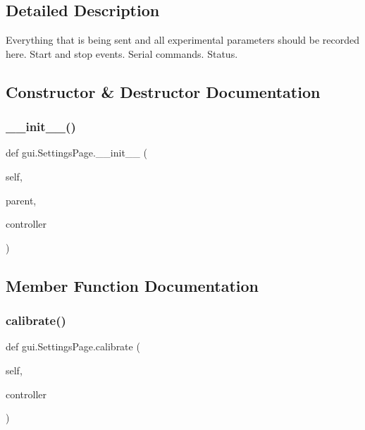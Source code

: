 \subsection{Detailed Description}
\begin{DoxyVerb}Everything that is being sent and all experimental parameters
should be recorded here. Start and stop events. Serial commands. Status.
\end{DoxyVerb}
 

\subsection{Constructor \& Destructor Documentation}
\mbox{\label{classgui_1_1_settings_page_a83cb55146a85b6aa6a42326179e86c3e}} 
\subsubsection{\texorpdfstring{\_\_init\_\_()}{\_\_init\_\_()}}
{\footnotesize\ttfamily def gui.\+Settings\+Page.\+\_\+\+\_\+init\+\_\+\+\_\+ (\begin{DoxyParamCaption}\item[{}]{self,  }\item[{}]{parent,  }\item[{}]{controller }\end{DoxyParamCaption})}



\subsection{Member Function Documentation}
\mbox{\label{classgui_1_1_settings_page_acf80cd46922483e88c69a77df3a0d4c2}} 
\subsubsection{\texorpdfstring{calibrate()}{calibrate()}}
{\footnotesize\ttfamily def gui.\+Settings\+Page.\+calibrate (\begin{DoxyParamCaption}\item[{}]{self,  }\item[{}]{controller }\end{DoxyParamCaption})}

